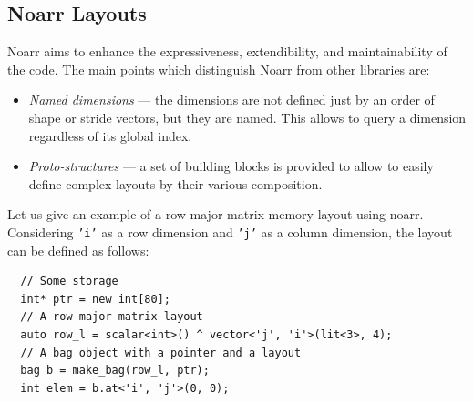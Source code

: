 
\subsection{Noarr Layouts}

Noarr aims to enhance the expressiveness, extendibility, and maintainability of the code. The main points which distinguish Noarr from other libraries are:

\begin{itemize}
  \item \emph{Named dimensions} --- the dimensions are not defined just by an order of shape or stride vectors, but they are named. This allows to query a dimension regardless of its global index.
  \item \emph{Proto-structures} --- a set of building blocks is provided to allow to easily define complex layouts by their various composition.
\end{itemize}

Let us give an example of a row-major matrix memory layout using noarr. Considering \texttt{'i'} as a row dimension and \texttt{'j'} as a column dimension, the layout can be defined as follows:

\begin{verbatim}
  // Some storage
  int* ptr = new int[80];
  // A row-major matrix layout
  auto row_l = scalar<int>() ^ vector<'j', 'i'>(lit<3>, 4);
  // A bag object with a pointer and a layout
  bag b = make_bag(row_l, ptr);
  int elem = b.at<'i', 'j'>(0, 0);
\end{verbatim}

